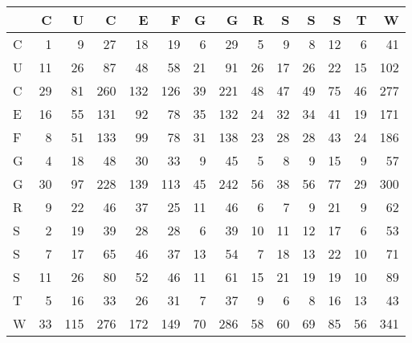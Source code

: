 \begin{tabular}{lrrrrrrrrrrrrr}
\toprule
{} &   C &    U &    C &    E &    F &   G &    G &   R &   S &   S &   S &   T &    W \\
\midrule
C &   1 &    9 &   27 &   18 &   19 &   6 &   29 &   5 &   9 &   8 &  12 &   6 &   41 \\
U &  11 &   26 &   87 &   48 &   58 &  21 &   91 &  26 &  17 &  26 &  22 &  15 &  102 \\
C &  29 &   81 &  260 &  132 &  126 &  39 &  221 &  48 &  47 &  49 &  75 &  46 &  277 \\
E &  16 &   55 &  131 &   92 &   78 &  35 &  132 &  24 &  32 &  34 &  41 &  19 &  171 \\
F &   8 &   51 &  133 &   99 &   78 &  31 &  138 &  23 &  28 &  28 &  43 &  24 &  186 \\
G &   4 &   18 &   48 &   30 &   33 &   9 &   45 &   5 &   8 &   9 &  15 &   9 &   57 \\
G &  30 &   97 &  228 &  139 &  113 &  45 &  242 &  56 &  38 &  56 &  77 &  29 &  300 \\
R &   9 &   22 &   46 &   37 &   25 &  11 &   46 &   6 &   7 &   9 &  21 &   9 &   62 \\
S &   2 &   19 &   39 &   28 &   28 &   6 &   39 &  10 &  11 &  12 &  17 &   6 &   53 \\
S &   7 &   17 &   65 &   46 &   37 &  13 &   54 &   7 &  18 &  13 &  22 &  10 &   71 \\
S &  11 &   26 &   80 &   52 &   46 &  11 &   61 &  15 &  21 &  19 &  19 &  10 &   89 \\
T &   5 &   16 &   33 &   26 &   31 &   7 &   37 &   9 &   6 &   8 &  16 &  13 &   43 \\
W &  33 &  115 &  276 &  172 &  149 &  70 &  286 &  58 &  60 &  69 &  85 &  56 &  341 \\
\bottomrule
\end{tabular}
